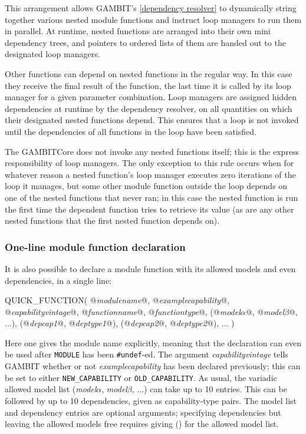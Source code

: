 \documentclass[pdftex,twocolumn,epjc3_preprint,runningheads]{svjour3}
\renewcommand{\_}{\discretionary{\underscore}{}{\underscore}}
\newcommand{\cross}[1]{\ref{#1}}
\newcommand{\metavarf}[1]{\textit{\color{darkgreen}\footnotesize\textrm{#1}}}
\newcommand{\metavar}{\metavarf}
\newcommand{\gambit}{\textsf{GAMBIT}\xspace}
\newcommand{\GB}{\gambit}
\begin{document}
This arrangement allows \GB's \cross{dependency resolver} to dynamically string together various nested module functions and instruct loop managers to run them in parallel.  At runtime, nested functions are arranged into their own mini dependency trees, and pointers to ordered lists of them are handed out to the designated loop managers.

Other functions can depend on nested functions in the regular way.  In this case they receive the final result of the function, the last time it is called by its loop manager for a given parameter combination.  Loop managers are assigned hidden dependencies at runtime by the dependency resolver, on all quantities on which their designated nested functions depend.  This ensures that a loop is not invoked until the dependencies of all functions in the loop have been satisfied.

The \GB \textsf{Core} does not invoke any nested functions itself; this is the express responsibility of loop managers.  The only exception to this rule occurs when for whatever reason a nested function's loop manager executes zero iterations of the loop it manages, but some other module function outside the loop depends on one of the nested functions that never ran; in this case the nested function is run the first time the dependent function tries to retrieve its value (as are any other nested functions that the first nested function depends on).

\subsubsection{One-line module function declaration}
\label{declaration_quick_function}

It is also possible to declare a module function with its allowed models and even dependencies, in a single line:
\begin{lstcpp}
QUICK_FUNCTION( @\metavar{module\_name}@,
    @\metavar{example\_capability}@,
    @\metavar{capability\_vintage}@,
    @\metavar{function\_name}@,
    @\metavar{function\_type}@,
    (@\metavar{model\_$\alpha$}@, @\metavar{model\_$\beta$}@, ...),
    (@\metavar{dep\_cap1}@, @\metavar{dep\_type1}@),
    (@\metavar{dep\_cap2}@, @\metavar{dep\_type2}@),
    ... )
\end{lstcpp}
Here one gives the module name explicitly, meaning that the declaration can even be used after \lstinline{MODULE} has been \mbox{\lstinline{#undef}-ed}.  The argument \metavar{capability\_vintage} tells \GB whether or not \metavar{example\_capability} has been declared previously; this can be set to either \lstinline{NEW_CAPABILITY} or \lstinline{OLD_CAPABILITY}.  As usual, the variadic allowed model list (\metavar{model\_$\alpha$}, \metavar{model\_$\beta$}, ...) can take up to 10 entries.  This can be followed by up to 10 dependencies, given as capability-type pairs.  The model list and dependency entries are optional arguments; specifying dependencies but leaving the allowed models free requires giving () for the allowed model list.
\end{document}
